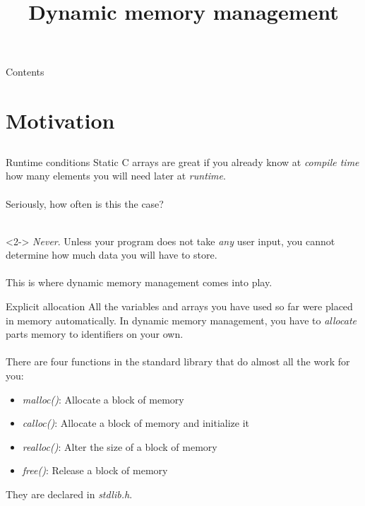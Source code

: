 
\newcommand{\topic}{
	Dynamic memory management
}
\usepackage{tikz}
\usetikzlibrary{arrows}
\usetikzlibrary{decorations.pathmorphing}

\title{\topic}
\supertitle{\course}
\date{}



\maketitle

\begin{frame}{Contents}
	\tableofcontents
\end{frame}

\section{Motivation}
\subsection{}
\begin{frame}{Runtime conditions}
	Static C arrays are great if you already know at \textit{compile time} how many elements you will need later at \textit{runtime}. \\ \ \\
	Seriously, how often is this the case? \\ \ \\
	\begin{uncoverenv}<2->
		\textit{Never}. Unless your program does not take \textit{any} user input, you cannot determine how much data you will have to store. \\ \ \\
		This is where dynamic memory management comes into play.
	\end{uncoverenv}
\end{frame}
\begin{frame}{Explicit allocation}
	All the variables and arrays you have used so far were placed in memory automatically. 
	In dynamic memory management, you have to \textit{allocate} parts memory to identifiers on your own. \\ \ \\
	There are four functions in the standard library that do almost all the work for you:
	\begin{itemize}
		\item \textit{malloc()}: Allocate a block of memory
		\item \textit{calloc()}: Allocate a block of memory and initialize it
		\item \textit{realloc()}: Alter the size of a block of memory
		\item \textit{free()}: Release a block of memory
	\end{itemize}
	They are declared in \textit{stdlib.h}.
\end{frame}
